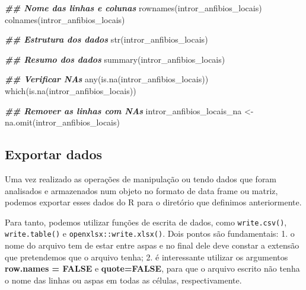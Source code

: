 \documentclass[
]{book}
\newenvironment{Shaded}{\begin{snugshade}}{\end{snugshade}}
\newcommand{\DocumentationTok}[1]{\textcolor[rgb]{0.37,0.37,0.37}{\textbf{\textit{#1}}}}
\newcommand{\FunctionTok}[1]{\textcolor[rgb]{0,0,0}{#1}}
\newcommand{\NormalTok}[1]{#1}
\newcommand{\OtherTok}[1]{\textcolor[rgb]{0.37,0.37,0.37}{#1}}
\begin{document}
\begin{Shaded}
\begin{Highlighting}[]
\DocumentationTok{\#\# Nome das linhas e colunas}
\FunctionTok{rownames}\NormalTok{(intror\_anfibios\_locais)}
\FunctionTok{colnames}\NormalTok{(intror\_anfibios\_locais)}

\DocumentationTok{\#\# Estrutura dos dados}
\FunctionTok{str}\NormalTok{(intror\_anfibios\_locais)}

\DocumentationTok{\#\# Resumo dos dados}
\FunctionTok{summary}\NormalTok{(intror\_anfibios\_locais)}

\DocumentationTok{\#\# Verificar NAs}
\FunctionTok{any}\NormalTok{(}\FunctionTok{is.na}\NormalTok{(intror\_anfibios\_locais))}
\FunctionTok{which}\NormalTok{(}\FunctionTok{is.na}\NormalTok{(intror\_anfibios\_locais))}

\DocumentationTok{\#\# Remover as linhas com NAs}
\NormalTok{intror\_anfibios\_locais\_na }\OtherTok{\textless{}{-}} \FunctionTok{na.omit}\NormalTok{(intror\_anfibios\_locais)}
\end{Highlighting}
\end{Shaded}

\hypertarget{exportar-dados}{%
\subsection{Exportar dados}\label{exportar-dados}}

Uma vez realizado as operações de manipulação ou tendo dados que foram analisados e armazenados num objeto no formato de data frame ou matriz, podemos exportar esses dados do R para o diretório que definimos anteriormente.

Para tanto, podemos utilizar funções de escrita de dados, como \texttt{write.csv()}, \texttt{write.table()} e \texttt{openxlsx::write.xlsx()}. Dois pontos são fundamentais: 1. o nome do arquivo tem de estar entre aspas e no final dele deve constar a extensão que pretendemos que o arquivo tenha; 2. é interessante utilizar os argumentos \textbf{row.names = FALSE} e \textbf{quote=FALSE}, para que o arquivo escrito não tenha o nome das linhas ou aspas em todas as células, respectivamente.
\end{document}
